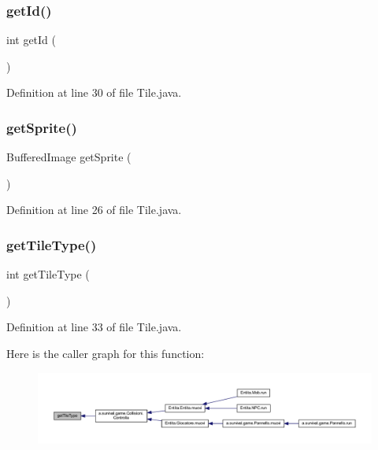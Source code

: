 \subsubsection{\texorpdfstring{get\+Id()}{getId()}}
{\footnotesize\ttfamily int get\+Id (\begin{DoxyParamCaption}{ }\end{DoxyParamCaption})}



Definition at line 30 of file Tile.\+java.

\mbox{\label{classblocchi_1_1_tile_ac51c0c8c26d79dc6df726b968276afb2}} 
\subsubsection{\texorpdfstring{get\+Sprite()}{getSprite()}}
{\footnotesize\ttfamily Buffered\+Image get\+Sprite (\begin{DoxyParamCaption}{ }\end{DoxyParamCaption})}



Definition at line 26 of file Tile.\+java.

\mbox{\label{classblocchi_1_1_tile_a19996fc03739127aa64afbd2f49c2a7c}} 
\subsubsection{\texorpdfstring{get\+Tile\+Type()}{getTileType()}}
{\footnotesize\ttfamily int get\+Tile\+Type (\begin{DoxyParamCaption}{ }\end{DoxyParamCaption})}



Definition at line 33 of file Tile.\+java.

Here is the caller graph for this function\+:
\nopagebreak
\begin{figure}[H]
\begin{center}
\leavevmode
\includegraphics[width=350pt]{classblocchi_1_1_tile_a19996fc03739127aa64afbd2f49c2a7c_icgraph}
\end{center}
\end{figure}


